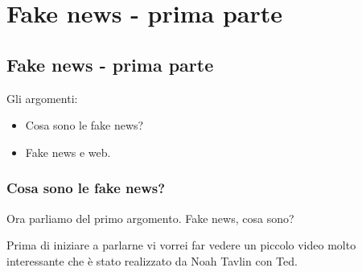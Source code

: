 \chapter{Fake news - prima parte}

\section{Fake news - prima parte}

Gli argomenti:
\begin{itemize}
    \item Cosa sono le fake news?
    \item Fake news e web.
\end{itemize}

\subsection{Cosa sono le fake news?}

Ora parliamo del primo argomento. Fake news, cosa sono?

Prima di iniziare a parlarne vi vorrei far vedere un piccolo video molto interessante che è stato realizzato da Noah Tavlin con Ted.

